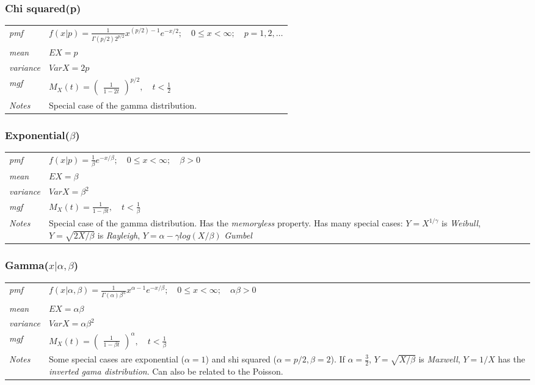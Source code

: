 \documentclass[12pt]{article}
\begin{document}
\subsubsection*{Chi squared(p)\cite[p. 623]{StatisticalInference}}
\begin{tabularx}{\textwidth}{ l X }
\emph{pmf} & $f(x|p)=\frac{1}{\Gamma(p/2)2^{p/2}}x^{(p/2)-1}e^{-x/2}; \quad 0 \leq x < \infty; \quad p=1, 2, \dots$ \\
\emph{mean} & $EX = p$ \\
\emph{variance} & $Var X = 2p$ \\
\emph{mgf} & $M_X(t)=\begin{pmatrix} \frac{1}{1-2t} \end{pmatrix}^{p/2}, \quad t < \frac{1}{2}$ \\
\emph{Notes} & Special case of the gamma distribution.\\
\end{tabularx}

\subsubsection*{Exponential($\beta$)\cite[p. 624]{StatisticalInference}}
\begin{tabularx}{\textwidth}{ l X }
\emph{pmf} & $f(x|p)=\frac{1}{\beta}e^{-x/\beta}; \quad 0 \leq x < \infty; \quad \beta>0$ \\
\emph{mean} & $EX = \beta$ \\
\emph{variance} & $Var X = \beta^2$ \\
\emph{mgf} & $M_X(t)= \frac{1}{1-\beta t}, \quad t < \frac{1}{\beta}$ \\
\emph{Notes} & Special case of the gamma distribution. Has the \emph{memoryless} property. Has many special cases: $Y=X^{1/\gamma}$ is \emph{Weibull}, $Y=\sqrt{2X/\beta}$ is \emph{Rayleigh}, $Y=\alpha - \gamma log(X/\beta)$ \emph{Gumbel}\\
\end{tabularx}

\subsubsection*{Gamma($x|\alpha, \beta$)\cite[p. 624]{StatisticalInference}}
\begin{tabularx}{\textwidth}{ l X }
\emph{pmf} & $f(x|\alpha, \beta)=\frac{1}{\Gamma(\alpha)\beta^{\alpha}} x^{\alpha - 1}e^{-x/\beta}; \quad 0 \leq x < \infty; \quad \alpha\beta>0$ \\
\emph{mean} & $EX = \alpha\beta$ \\
\emph{variance} & $Var X = \alpha\beta^2$ \\
\emph{mgf} & $M_X(t)= \begin{pmatrix}\frac{1}{1-\beta t}\end{pmatrix}^{\alpha}, \quad t < \frac{1}{\beta}$ \\
\emph{Notes} & Some special cases are exponential ($\alpha = 1$) and shi squared ($\alpha = p/2, \beta = 2$). If $\alpha = \frac{3}{2}$, $Y=\sqrt{X/\beta}$ is \emph{Maxwell}, $Y=1/X$ has the \emph{inverted gama distribution}. Can also be related to the Poisson.\\
\end{tabularx}
\end{document}
